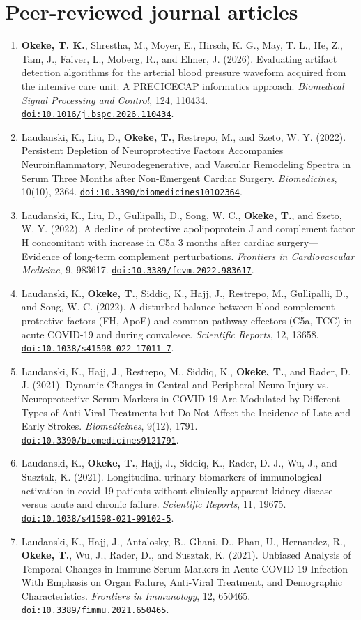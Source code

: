 \documentclass[11pt,letterpaper]{article}
\newcommand{\doi}[1]{\href{https://doi.org/#1}{\nolinkurl{doi:#1}}}
\begin{document}
\section{Peer-reviewed journal articles}
\begin{enumerate}
\item \textbf{Okeke, T. K.}, Shrestha, M., Moyer, E., Hirsch, K. G., May, T. L., He, Z., Tam, J., Faiver, L., Moberg, R., and Elmer, J. (2026). Evaluating artifact detection algorithms for the arterial blood pressure waveform acquired from the intensive care unit: A PRECICECAP informatics approach. \textit{Biomedical Signal Processing and Control}, 124, 110434. \doi{10.1016/j.bspc.2026.110434}.
\item Laudanski, K., Liu, D., \textbf{Okeke, T.}, Restrepo, M., and Szeto, W. Y. (2022). Persistent Depletion of Neuroprotective Factors Accompanies Neuroinflammatory, Neurodegenerative, and Vascular Remodeling Spectra in Serum Three Months after Non-Emergent Cardiac Surgery. \textit{Biomedicines}, 10(10), 2364. \doi{10.3390/biomedicines10102364}.
\item Laudanski, K., Liu, D., Gullipalli, D., Song, W. C., \textbf{Okeke, T.}, and Szeto, W. Y. (2022). A decline of protective apolipoprotein J and complement factor H concomitant with increase in C5a 3 months after cardiac surgery---Evidence of long-term complement perturbations. \textit{Frontiers in Cardiovascular Medicine}, 9, 983617. \doi{10.3389/fcvm.2022.983617}.
\item Laudanski, K., \textbf{Okeke, T.}, Siddiq, K., Hajj, J., Restrepo, M., Gullipalli, D., and Song, W. C. (2022). A disturbed balance between blood complement protective factors (FH, ApoE) and common pathway effectors (C5a, TCC) in acute COVID-19 and during convalesce. \textit{Scientific Reports}, 12, 13658. \doi{10.1038/s41598-022-17011-7}.
\item Laudanski, K., Hajj, J., Restrepo, M., Siddiq, K., \textbf{Okeke, T.}, and Rader, D. J. (2021). Dynamic Changes in Central and Peripheral Neuro-Injury vs. Neuroprotective Serum Markers in COVID-19 Are Modulated by Different Types of Anti-Viral Treatments but Do Not Affect the Incidence of Late and Early Strokes. \textit{Biomedicines}, 9(12), 1791. \doi{10.3390/biomedicines9121791}.
\item Laudanski, K., \textbf{Okeke, T.}, Hajj, J., Siddiq, K., Rader, D. J., Wu, J., and Susztak, K. (2021). Longitudinal urinary biomarkers of immunological activation in covid-19 patients without clinically apparent kidney disease versus acute and chronic failure. \textit{Scientific Reports}, 11, 19675. \doi{10.1038/s41598-021-99102-5}.
\item Laudanski, K., Hajj, J., Antalosky, B., Ghani, D., Phan, U., Hernandez, R., \textbf{Okeke, T.}, Wu, J., Rader, D., and Susztak, K. (2021). Unbiased Analysis of Temporal Changes in Immune Serum Markers in Acute COVID-19 Infection With Emphasis on Organ Failure, Anti-Viral Treatment, and Demographic Characteristics. \textit{Frontiers in Immunology}, 12, 650465. \doi{10.3389/fimmu.2021.650465}.
\end{enumerate}
\end{document}
